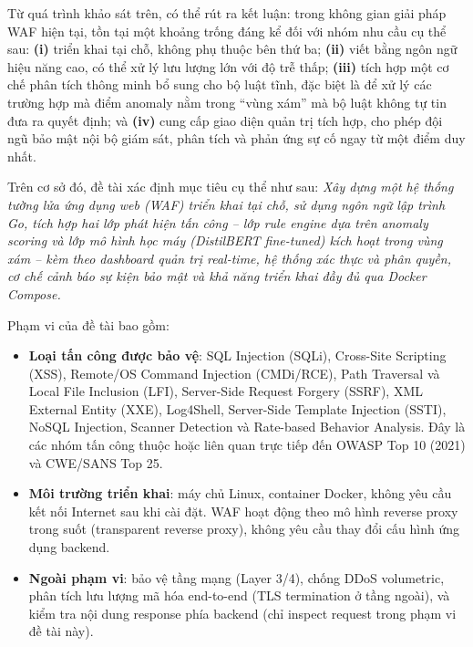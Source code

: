 \documentclass[../DoAn.tex]{subfiles}
\begin{document}
Từ quá trình khảo sát trên, có thể rút ra kết luận: trong không gian giải pháp
WAF hiện tại, tồn tại một khoảng trống đáng kể đối với nhóm nhu cầu cụ thể
sau: \textbf{(i)} triển khai tại chỗ, không phụ thuộc bên thứ ba; \textbf{(ii)} viết
bằng ngôn ngữ hiệu năng cao, có thể xử lý lưu lượng lớn với độ trễ thấp; \textbf{(iii)}
tích hợp một cơ chế phân tích thông minh bổ sung cho bộ luật tĩnh, đặc biệt là để
xử lý các trường hợp mà điểm anomaly nằm trong ``vùng xám'' mà bộ luật không
tự tin đưa ra quyết định; và \textbf{(iv)} cung cấp giao diện quản trị tích hợp, cho
phép đội ngũ bảo mật nội bộ giám sát, phân tích và phản ứng sự cố ngay từ một
điểm duy nhất.

Trên cơ sở đó, đề tài xác định mục tiêu cụ thể như sau: \textit{Xây dựng một
hệ thống tường lửa ứng dụng web (WAF) triển khai tại chỗ, sử dụng ngôn ngữ
lập trình Go, tích hợp hai lớp phát hiện tấn công -- lớp rule engine dựa trên anomaly
scoring và lớp mô hình học máy (DistilBERT fine-tuned) kích hoạt trong vùng xám
-- kèm theo dashboard quản trị real-time, hệ thống xác thực và phân quyền, cơ
chế cảnh báo sự kiện bảo mật và khả năng triển khai đầy đủ qua Docker Compose.}

Phạm vi của đề tài bao gồm:
\begin{itemize}[leftmargin=*]
    \item \textbf{Loại tấn công được bảo vệ}: SQL Injection (SQLi), Cross-Site
    Scripting (XSS), Remote/OS Command Injection (CMDi/RCE), Path Traversal
    và Local File Inclusion (LFI), Server-Side Request Forgery (SSRF), XML
    External Entity (XXE), Log4Shell, Server-Side Template Injection (SSTI),
    NoSQL Injection, Scanner Detection và Rate-based Behavior Analysis. Đây
    là các nhóm tấn công thuộc hoặc liên quan trực tiếp đến OWASP Top 10 (2021)
    và CWE/SANS Top 25.

    \item \textbf{Môi trường triển khai}: máy chủ Linux, container Docker, không
    yêu cầu kết nối Internet sau khi cài đặt. WAF hoạt động theo mô hình
    reverse proxy trong suốt (transparent reverse proxy), không yêu cầu thay
    đổi cấu hình ứng dụng backend.

    \item \textbf{Ngoài phạm vi}: bảo vệ tầng mạng (Layer 3/4), chống DDoS
    volumetric, phân tích lưu lượng mã hóa end-to-end (TLS termination ở
    tầng ngoài), và kiểm tra nội dung response phía backend (chỉ inspect
    request trong phạm vi đề tài này).
\end{itemize}
\end{document}
